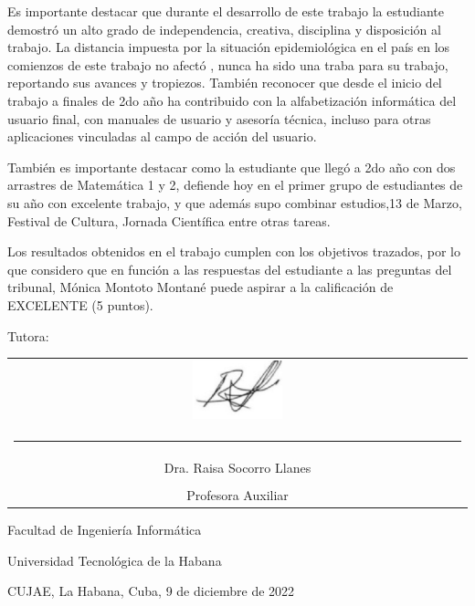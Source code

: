 Es importante destacar que durante el desarrollo de este trabajo la estudiante demostró un alto grado de independencia, creativa, disciplina y disposición al trabajo. La distancia impuesta por la situación epidemiológica en el país en los comienzos de este trabajo no afectó , nunca ha sido una traba para su trabajo, reportando sus avances y tropiezos. También reconocer que desde el inicio del trabajo a finales de 2do año ha contribuido con la alfabetización informática del usuario final, con manuales de usuario y asesoría técnica, incluso para otras aplicaciones vinculadas al campo de acción del usuario.

También es importante destacar como la estudiante que llegó a 2do año con dos arrastres de Matemática 1 y 2, defiende hoy en el primer grupo de estudiantes de su año con excelente trabajo, y que además supo combinar estudios,13 de Marzo, Festival de Cultura, Jornada Científica entre otras tareas.

Los resultados obtenidos en el trabajo cumplen con los objetivos trazados, por lo que considero que en función a las respuestas del estudiante a las preguntas del tribunal, Mónica Montoto Montané puede aspirar a la calificación de EXCELENTE (5 puntos).

\vspace{1.5cm}

Tutora:

\vspace{1.5cm}
\begingroup	
\setlength{\tabcolsep}{10pt} %
\renewcommand{\arraystretch}{0.5} %

\begin{tabular}{c}
	\includegraphics[width=0.2\textwidth]{imagen/raisa.png}\\
	\noindent\rule{6cm}{0.4pt}\\
	Dra. Raisa Socorro Llanes \\
	\\
	Profesora Auxiliar 
\end{tabular}
\endgroup

\vspace{1.5cm}
Facultad de Ingeniería Informática

Universidad Tecnológica de la Habana 

CUJAE, La Habana, Cuba, 9 de diciembre de 2022